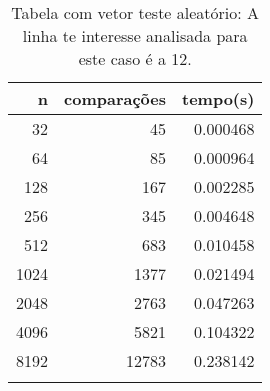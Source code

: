 \begin{table}[ht]
\centering
\begin{tabular}{rrr} \toprule
        n &    comparações &       tempo(s) \\ \midrule
      32  &             45 &      0.000468 \\
      64  &             85 &      0.000964 \\
     128  &            167 &      0.002285 \\
     256  &            345 &      0.004648 \\
     512  &            683 &      0.010458 \\
    1024  &           1377 &      0.021494 \\
    2048  &           2763 &      0.047263 \\
    4096  &           5821 &      0.104322 \\
    8192  &          12783 &      0.238142 \\
\bottomrule\addlinespace
\end{tabular}
\caption{Tabela com vetor teste aleatório: A linha te interesse analisada para este caso é a 12.}
\label{tab:quicksortAleatorio}
\end{table}
